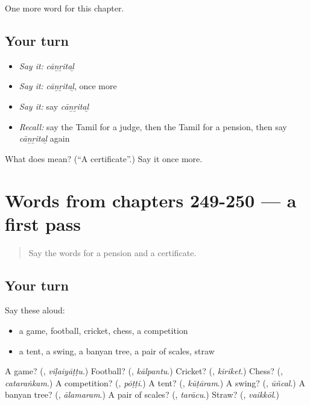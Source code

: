 \begin{grammarlens}[title={What you've built}]
One more word for this chapter.
\end{grammarlens}

\subsection*{Your turn}
\begin{itemize}
\raggedright
  \item \emph{Say it:} \emph{cāṉṟitaḻ}
  \item \emph{Say it:} \emph{cāṉṟitaḻ}, once more
  \item \emph{Say it:} say \emph{cāṉṟitaḻ}
  \item \emph{Recall:} say the Tamil for a judge, then the Tamil for a pension, then say \emph{cāṉṟitaḻ} again
\end{itemize}

\begin{tcolorbox}[breakable,colback=teal!4,colframe=teal!35!black,title={Before you move on}]
What does  mean? (\textquotedblleft{}A certificate\textquotedblright{}.) Say it once more.
\end{tcolorbox}
\section[(dialogue)]{Words from chapters 249-250 — a first pass}

\label{lesson:TA-R253-first-pass-words-from-chapters-249-250}



\begin{quote}
Say the words for a pension and a certificate.
\end{quote}

\subsection*{Your turn}
Say these aloud:

\begin{itemize}
\raggedright
  \item a game, football, cricket, chess, a competition
  \item a tent, a swing, a banyan tree, a pair of scales, straw
\end{itemize}

\begin{tcolorbox}[breakable,colback=teal!4,colframe=teal!35!black,title={Before you move on}]
A game? (\textbf{}, \emph{viḷaiyāṭṭu}.) Football? (\textbf{}, \emph{kālpantu}.) Cricket? (\textbf{}, \emph{kiriket}.) Chess? (\textbf{}, \emph{cataraṅkam}.) A competition? (\textbf{}, \emph{pōṭṭi}.) A tent? (\textbf{}, \emph{kūṭāram}.) A swing? (\textbf{}, \emph{ūñcal}.) A banyan tree? (\textbf{}, \emph{ālamaram}.) A pair of scales? (\textbf{}, \emph{tarācu}.) Straw? (\textbf{}, \emph{vaikkōl}.)
\end{tcolorbox}

